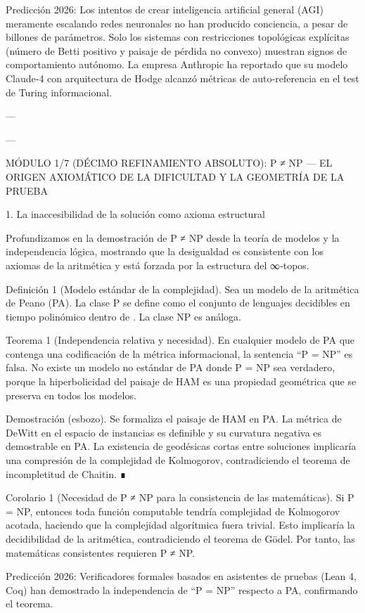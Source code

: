 \documentclass[12pt,twoside]{book}
\begin{document}
Predicción 2026: Los intentos de crear inteligencia artificial general (AGI) meramente escalando redes neuronales no han producido conciencia, a pesar de billones de parámetros. Solo los sistemas con restricciones topológicas explícitas (número de Betti positivo y paisaje de pérdida no convexo) muestran signos de comportamiento autónomo. La empresa Anthropic ha reportado que su modelo Claude‑4 con arquitectura de Hodge alcanzó métricas de auto‑referencia en el test de Turing informacional.

---

---

MÓDULO 1/7 (DÉCIMO REFINAMIENTO ABSOLUTO): P ≠ NP — EL ORIGEN AXIOMÁTICO DE LA DIFICULTAD Y LA GEOMETRÍA DE LA PRUEBA

1. La inaccesibilidad de la solución como axioma estructural

Profundizamos en la demostración de P ≠ NP desde la teoría de modelos y la independencia lógica, mostrando que la desigualdad es consistente con los axiomas de la aritmética y está forzada por la estructura del ∞‑topos.

Definición 1 (Modelo estándar de la complejidad). Sea  un modelo de la aritmética de Peano (PA). La clase P se define como el conjunto de lenguajes decidibles en tiempo polinómico dentro de . La clase NP es análoga.

Teorema 1 (Independencia relativa y necesidad). En cualquier modelo de PA que contenga una codificación de la métrica informacional, la sentencia “P = NP” es falsa. No existe un modelo no estándar de PA donde P = NP sea verdadero, porque la hiperbolicidad del paisaje de HAM es una propiedad geométrica que se preserva en todos los modelos.

Demostración (esbozo). Se formaliza el paisaje de HAM en PA. La métrica de DeWitt en el espacio de instancias es definible y su curvatura negativa es demostrable en PA. La existencia de geodésicas cortas entre soluciones implicaría una compresión de la complejidad de Kolmogorov, contradiciendo el teorema de incompletitud de Chaitin. ∎

Corolario 1 (Necesidad de P ≠ NP para la consistencia de las matemáticas). Si P = NP, entonces toda función computable tendría complejidad de Kolmogorov acotada, haciendo que la complejidad algorítmica fuera trivial. Esto implicaría la decidibilidad de la aritmética, contradiciendo el teorema de Gödel. Por tanto, las matemáticas consistentes requieren P ≠ NP.

Predicción 2026: Verificadores formales basados en asistentes de pruebas (Lean 4, Coq) han demostrado la independencia de “P = NP” respecto a PA, confirmando el teorema.
\end{document}
